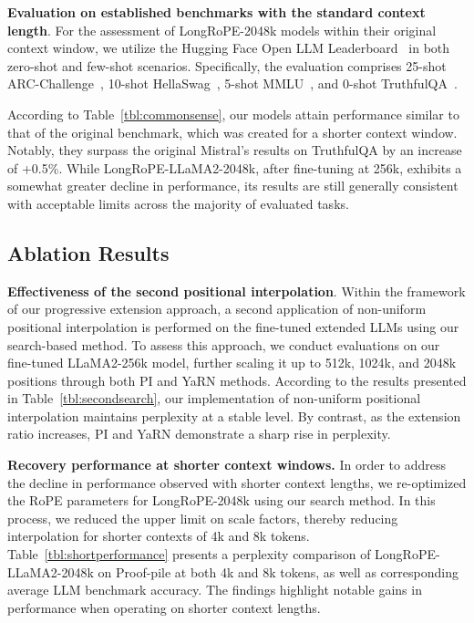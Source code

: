 \textbf{Evaluation on established benchmarks with the standard context length}. For the assessment of LongRoPE-2048k models within their original context window, we utilize the Hugging Face Open LLM Leaderboard~\cite{huggingfaceboard} in both zero-shot and few-shot scenarios. Specifically, the evaluation comprises 25-shot ARC-Challenge~\cite{allenai:arc}, 10-shot HellaSwag~\cite{zellers2019hellaswag}, 5-shot MMLU~\cite{mmlu}, and 0-shot TruthfulQA~\cite{lin2021truthfulqa}.

According to Table~\ref{tbl:commonsense}, our models attain performance similar to that of the original benchmark, which was created for a shorter context window. Notably, they surpass the original Mistral's results on TruthfulQA by an increase of +0.5\%. While LongRoPE-LLaMA2-2048k, after fine-tuning at 256k, exhibits a somewhat greater decline in performance, its results are still generally consistent with acceptable limits across the majority of evaluated tasks.

\subsection{Ablation Results}

\textbf{Effectiveness of the second positional interpolation}. Within the framework of our progressive extension approach, a second application of non-uniform positional interpolation is performed on the fine-tuned extended LLMs using our search-based method. To assess this approach, we conduct evaluations on our fine-tuned LLaMA2-256k model, further scaling it up to 512k, 1024k, and 2048k positions through both PI and YaRN methods. According to the results presented in Table~\ref{tbl:secondsearch}, our implementation of non-uniform positional interpolation maintains perplexity at a stable level. By contrast, as the extension ratio increases, PI and YaRN demonstrate a sharp rise in perplexity.

\textbf{Recovery performance at shorter context windows.} In order to address the decline in performance observed with shorter context lengths, we re-optimized the RoPE parameters for LongRoPE-2048k using our search method. In this process, we reduced the upper limit on scale factors, thereby reducing interpolation for shorter contexts of 4k and 8k tokens. Table~\ref{tbl:shortperformance} presents a perplexity comparison of LongRoPE-LLaMA2-2048k on Proof-pile at both 4k and 8k tokens, as well as corresponding average LLM benchmark accuracy. The findings highlight notable gains in performance when operating on shorter context lengths.

